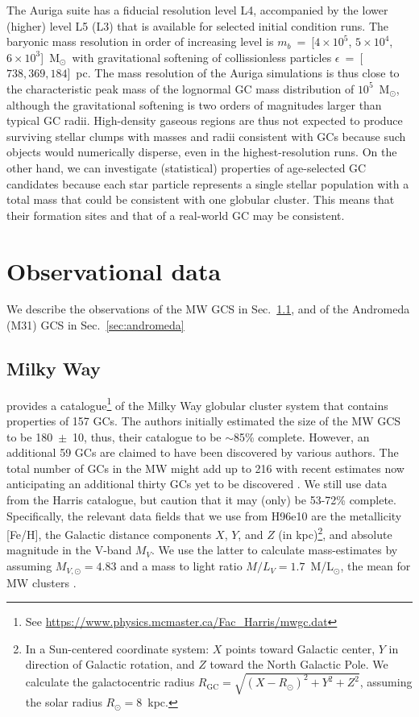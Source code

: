 \documentclass[a4paper,fleqn,usenatbib]{mnras}
\newcommand{\Sun}[0]{\ensuremath{_{\odot}}}
\providecommand{\DIFdelbegin}{} %
\newcommand{\DIFscaledelfig}{0.5}
\newlength{\DIFdelgraphicswidth} %
\newlength{\DIFdelgraphicsheight} %
\newcommand{\DIFdelincludegraphics}[2][]{%
\sbox{\DIFdelgraphicsbox}{\DIFOincludegraphics[#1]{#2}}%
\settoboxwidth{\DIFdelgraphicswidth}{\DIFdelgraphicsbox} %
\settoboxtotalheight{\DIFdelgraphicsheight}{\DIFdelgraphicsbox} %
\scalebox{\DIFscaledelfig}{%
\parbox[b]{\DIFdelgraphicswidth}{\usebox{\DIFdelgraphicsbox}\\[-\baselineskip] \rule{\DIFdelgraphicswidth}{0em}}\llap{\resizebox{\DIFdelgraphicswidth}{\DIFdelgraphicsheight}{%
\setlength{\unitlength}{\DIFdelgraphicswidth}%
\begin{picture}(1,1)%
\thicklines\linethickness{2pt} %
{\color[rgb]{1,0,0}\put(0,0){\framebox(1,1){}}}%
{\color[rgb]{1,0,0}\put(0,0){\line( 1,1){1}}}%
{\color[rgb]{1,0,0}\put(0,1){\line(1,-1){1}}}%
\end{picture}%
}\hspace*{3pt}}} %
} %
\DeclareRobustCommand{\DIFdelbegin}{\DIFOdelbegin \let\includegraphics\DIFdelincludegraphics} %
\begin{document}
The Auriga suite has a fiducial resolution level L4, accompanied by the lower
(higher) level L5 (L3) that is available for selected initial condition runs.
The baryonic mass resolution in order of increasing level is $m_b$~=~[$4 \times 10^5$,
$5 \times 10^4$, $6 \times 10^3$]~M\Sun \, with gravitational softening of
collissionless particles $\epsilon$~=~[$738, 369, 184$]~pc. The mass resolution
of the Auriga simulations is thus close to the characteristic peak mass of the
lognormal GC mass distribution of $10^{5}$~M\Sun \citep{1991ARA&A..29..543H},
although the gravitational softening is two orders of magnitudes larger than
typical GC radii. High-density gaseous regions are thus not expected to produce
surviving stellar clumps with masses and radii consistent with GCs because
such objects would numerically disperse, even in the highest-resolution runs.
On the other hand, we can investigate (statistical) properties of age-selected
GC candidates because each star particle represents a single stellar population
with a total mass that could be consistent with one globular cluster. This means
that their formation sites and that of a real-world GC may be consistent.

\section{Observational data}
\label{sec:observations}
We describe the observations of the MW GCS in Sec.~\ref{sec:milkyway},
and of the Andromeda (M31) GCS in Sec.~\ref{sec:andromeda}


\subsection{Milky Way}
\label{sec:milkyway}
\citet[][2010 edition; hereafter H96e10]{1996AJ....112.1487H} provides a
catalogue\footnote{See \url{https://www.physics.mcmaster.ca/Fac_Harris/mwgc.dat}}
of the Milky Way globular cluster system that contains properties of
157 GCs. The authors initially estimated the size of the MW GCS to be 180~$\pm$~10,
thus, their catalogue to be ${\sim}$85\% complete. However, an additional 59 GCs
are claimed to have been discovered by various authors. The total number of GCs
in the MW might add up to 216 with recent estimates now anticipating an additional 
thirty GCs yet to be discovered \citep[e.g.][and references therein]{2018ApJ...863L..38R}.
We still use data from the Harris catalogue, but caution that it may (only) be
53-72\% complete. Specifically, the relevant data fields that we use from H96e10
are the metallicity [Fe/H], the Galactic distance components $X$, $Y$, and $Z$ (in
kpc)\footnote{In a Sun-centered coordinate system: $X$ points toward Galactic
center, $Y$ in direction of Galactic rotation, and $Z$ toward the North Galactic
Pole. We calculate the galactocentric radius $R_{\text{GC}}=\sqrt{(X-R_\odot)^2
+ Y^2 + Z^2}$, assuming the solar radius $R_\odot=8$~kpc.}, and absolute
magnitude in the V-band $M_V$. We use the latter to calculate mass-estimates by
assuming $M_{V,\odot}=4.83$ and a mass to light ratio $M/L_V = 1.7$~M/L$_{\odot}$,
the mean for MW clusters \citep{2005ApJS..161..304M}. \DIFdelbegin %
\end{document}
